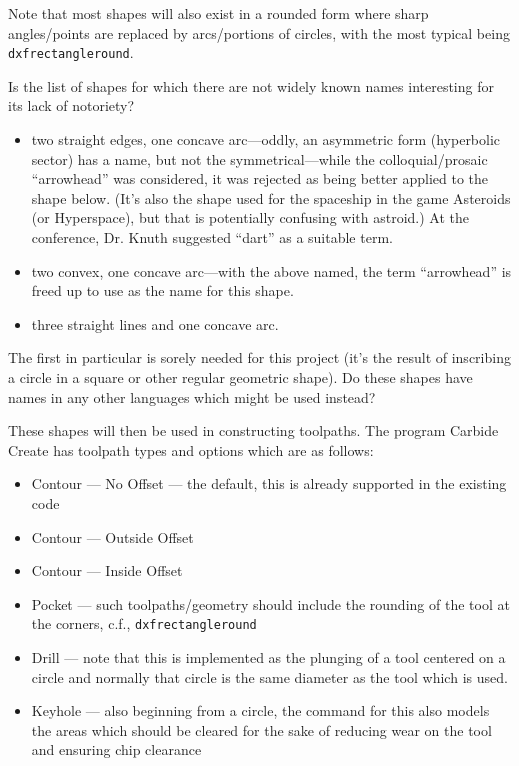 \documentclass{ltxdoc}
\begin{document}
Note that most shapes will also exist in a rounded form where sharp angles/points are replaced by arcs/portions of circles, with the most typical being \verb|dxfrectangleround|.

Is the list of shapes for which there are not widely known names interesting for its lack of notoriety?

\begin{itemize}
 \item two straight edges, one concave arc---oddly, an asymmetric form (hyperbolic sector) has a name, 
       but not the symmetrical---while the colloquial/prosaic ``arrowhead'' was considered, it was
       rejected as being better applied to the shape below. (It's also the shape used for the
       spaceship in the game Asteroids (or Hyperspace), but that  is potentially confusing with
       astroid.) At the  conference, Dr. Knuth suggested ``dart'' as a suitable term.
 \item two convex, one concave arc---with the above named, the term ``arrowhead'' is freed up to use
       as the name for this shape.
 \item three straight lines and one concave arc.
 \end{itemize}

 The first in particular is sorely needed for this project (it's the result of inscribing a circle in a square or other regular geometric shape). Do these shapes have names in any other languages which might be used instead?

These shapes will then be used in constructing toolpaths. The program Carbide Create has toolpath types and options which are as follows:

\begin{itemize}
 \item Contour --- No Offset --- the default, this is already supported in the existing code
 \item Contour --- Outside Offset
 \item Contour --- Inside Offset
 \item Pocket --- such toolpaths/geometry should include the rounding of the tool 
       at the corners, c.f., \verb|dxfrectangleround|
 \item Drill --- note that this is implemented as the plunging of a tool centered on a circle
                 and normally that circle is the same diameter as the tool which is used.
 \item Keyhole --- also beginning from a circle, the command for this also models the areas which
                   should be cleared for the sake of reducing wear
                   on the tool and ensuring chip clearance
\end{itemize}
\end{document}
